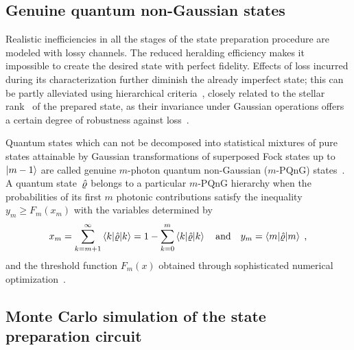\documentclass{article}
\begin{document}
%

%
%

\subsection*{Genuine quantum non-Gaussian states}

Realistic inefficiencies in all the stages of the state preparation procedure are modeled with lossy channels. The reduced heralding efficiency makes it impossible to create the desired state with perfect fidelity. Effects of loss incurred during its characterization further diminish the already imperfect state; this can be partly alleviated using hierarchical criteria~\cite{lachman2019}, closely related to the stellar rank~\cite{chabaud2020,walschaers2021,fiurasek2022} of the prepared state, as their invariance under Gaussian operations offers a certain degree of robustness against loss~\cite{lachman2019}.

Quantum states which can not be decomposed into statistical mixtures of pure states attainable by Gaussian transformations of superposed Fock states up to ${\ket{m - 1}}$ are called genuine $m$-photon quantum non-Gaussian ($m$-PQnG) states~\cite{lachman2019}. A quantum state~$\hat{\varrho}$ belongs to a particular $m$-PQnG hierarchy when the probabilities of its first $m$ photonic contributions
satisfy the inequality~${y_{m} \geq F_{m} (x_{m})}$ with the variables determined by
%
\begin{equation}
  x_{m} 
    = \sum_{k = m + 1}^{\infty} 
      \braket{k | \hat{\varrho} | k}
    = 1 - \sum_{k = 0}^{m} 
      \braket{k | \hat{\varrho} | k}
  \quad\text{and}\quad
  y_{m} = \braket{m | \hat{\varrho} | m}
  \;\text{,}
\end{equation}
%
and the threshold function $F_{m}(x)$ obtained through sophisticated numerical optimization~\cite{lachman2019,fiurasek2022}.

%
%

\subsection*{Monte Carlo simulation of the state preparation circuit}
\end{document}
